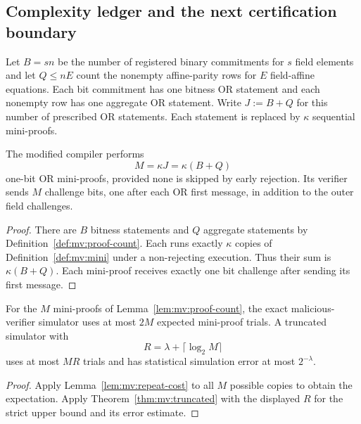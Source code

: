 \subsection{Complexity ledger and the next certification boundary}\label{sec:mv:cost}

\begin{definition}\label{def:mv:proof-count}
Let $B=sn$ be the number of registered
binary commitments for $s$ field
elements and let $Q\le nE$ count the
nonempty affine-parity rows for
$E$ field-affine equations.
Each bit commitment has one bitness
OR statement and each nonempty row
has one aggregate OR statement.
Write $J:=B+Q$ for this number
of prescribed OR statements.
Each statement is replaced by
$\kappa$ sequential mini-proofs.
\end{definition}

\begin{lemma}\label{lem:mv:proof-count}
The modified compiler performs
\[
 \boxed{M=\kappa J=\kappa(B+Q)}
\]
one-bit OR mini-proofs, provided
none is skipped by early rejection.
Its verifier sends $M$ challenge
bits, one after each OR first
message, in addition to the
outer field challenges.
\end{lemma}
\begin{proof}
There are $B$ bitness statements
and $Q$ aggregate statements
by Definition~\ref{def:mv:proof-count}.
Each runs exactly $\kappa$ copies
of Definition~\ref{def:mv:mini}
under a non-rejecting execution.
Thus their sum is
$\kappa(B+Q)$.
Each mini-proof receives exactly
one bit challenge after sending
its first message.
\end{proof}

\begin{lemma}\label{lem:mv:simulation-cost}
For the $M$ mini-proofs of
Lemma~\ref{lem:mv:proof-count},
the exact malicious-verifier
simulator uses at most $2M$
expected mini-proof trials.
A truncated simulator with
\[
 R=\lambda+\lceil\log_2 M\rceil
\]
uses at most $MR$ trials and
has statistical simulation
error at most $2^{-\lambda}$.
\end{lemma}
\begin{proof}
Apply
Lemma~\ref{lem:mv:repeat-cost}
to all $M$ possible copies
to obtain the expectation.
Apply
Theorem~\ref{thm:mv:truncated}
with the displayed $R$
for the strict upper bound
and its error estimate.
\end{proof}

